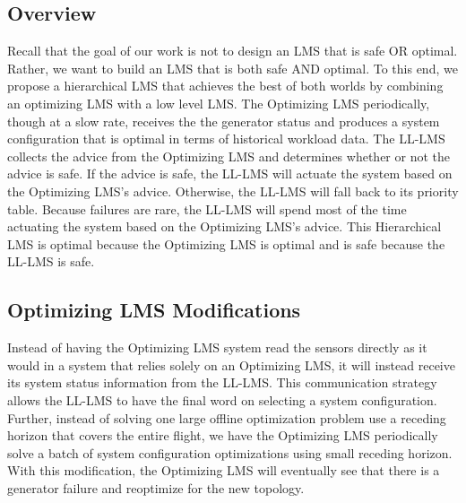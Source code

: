 \documentclass{acm_proc_article-sp}
\begin{document}
\subsection{Overview}
Recall that the goal of our work is not to design an LMS that is safe OR optimal. 
Rather, we want to build an LMS that is both safe AND optimal. 
To this end, we propose a hierarchical LMS that achieves the best of both worlds by combining an optimizing LMS with a low level LMS. The Optimizing LMS periodically, though at a slow rate, receives the the generator status and produces a system configuration that is optimal in terms of historical workload data. 
The LL-LMS collects the advice from the Optimizing LMS and determines whether or not the advice is safe. 
If the advice is safe, the LL-LMS will actuate the system based on the Optimizing LMS's advice. 
Otherwise, the LL-LMS will fall back to its priority table. 
Because failures are rare, the LL-LMS will spend most of the time actuating the system based on the Optimizing LMS's advice. 
This Hierarchical LMS is optimal because the Optimizing LMS is optimal and is safe because the LL-LMS is safe.

\subsection{Optimizing LMS Modifications}
Instead of having the Optimizing LMS system read the sensors directly as it would in a system that relies solely on an Optimizing LMS, it will instead receive its system status information from the LL-LMS. 
This communication strategy allows the LL-LMS to have the final word on selecting a system configuration.
Further, instead of solving one large offline optimization problem use a receding horizon that covers the entire flight, we have the Optimizing LMS periodically solve a batch of system configuration optimizations using small receding horizon.
With this modification, the Optimizing LMS will eventually see that there is a generator failure and reoptimize for the new topology.
\end{document}
